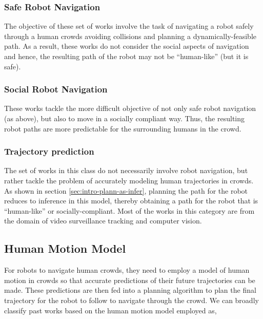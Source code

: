 \subsubsection{Safe Robot Navigation}
\label{sec:survey-safe-robot-navig}

The objective of these set of works involve the task of navigating a robot safely through a human crowds avoiding collisions and planning a dynamically-feasible path. As a result, these works do not consider the social aspects of navigation and hence, the resulting path of the robot may not be ``human-like'' (but it is safe).

\subsubsection{Social Robot Navigation}
\label{sec:survey-soci-robot-navig}

These works tackle the more difficult objective of not only safe robot navigation (as above), but also to move in a socially compliant way. Thus, the resulting robot paths are more predictable for the surrounding humans in the crowd.

\subsubsection{Trajectory prediction}
\label{sec:survey-traj-pred}

The set of works in this class do not necessarily involve robot navigation, but rather tackle the problem of accurately modeling human trajectories in crowds. As shown in section \ref{sec:intro-plann-as-infer}, planning the path for the robot reduces to inference in this model, thereby obtaining a path for the robot that is ``human-like'' or socially-compliant. Most of the works in this category are from the domain of video surveillance tracking and computer vision.



\subsection{Human Motion Model}
\label{sec:survey-human-motion-model}

For robots to navigate human crowds, they need to employ a model of human motion in crowds so that accurate predictions of their future trajectories can be made. These predictions are then fed into a planning algorithm to plan the final trajectory for the robot to follow to navigate through the crowd. We can broadly classify past works based on the human motion model employed as,

